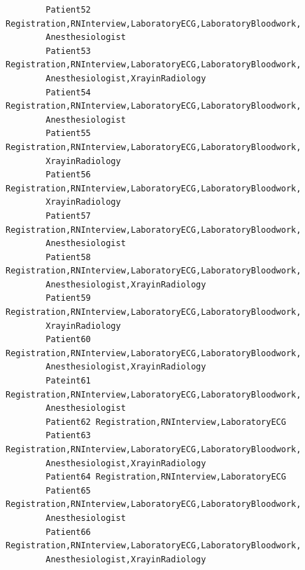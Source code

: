 \documentclass[12pt]{article}
\begin{document}
\begin{verbatim}
		Patient52 Registration,RNInterview,LaboratoryECG,LaboratoryBloodwork,
		Anesthesiologist
		Patient53 Registration,RNInterview,LaboratoryECG,LaboratoryBloodwork,
		Anesthesiologist,XrayinRadiology
		Patient54 Registration,RNInterview,LaboratoryECG,LaboratoryBloodwork,
		Anesthesiologist
		Patient55 Registration,RNInterview,LaboratoryECG,LaboratoryBloodwork,
		XrayinRadiology
		Patient56 Registration,RNInterview,LaboratoryECG,LaboratoryBloodwork,
		XrayinRadiology
		Patient57 Registration,RNInterview,LaboratoryECG,LaboratoryBloodwork,
		Anesthesiologist
		Patient58 Registration,RNInterview,LaboratoryECG,LaboratoryBloodwork,
		Anesthesiologist,XrayinRadiology
		Patient59 Registration,RNInterview,LaboratoryECG,LaboratoryBloodwork,
		XrayinRadiology
		Patient60 Registration,RNInterview,LaboratoryECG,LaboratoryBloodwork,
		Anesthesiologist,XrayinRadiology
		Pateint61 Registration,RNInterview,LaboratoryECG,LaboratoryBloodwork,
		Anesthesiologist
		Patient62 Registration,RNInterview,LaboratoryECG
		Patient63 Registration,RNInterview,LaboratoryECG,LaboratoryBloodwork,
		Anesthesiologist,XrayinRadiology
		Patient64 Registration,RNInterview,LaboratoryECG
		Patient65 Registration,RNInterview,LaboratoryECG,LaboratoryBloodwork,
		Anesthesiologist
		Patient66 Registration,RNInterview,LaboratoryECG,LaboratoryBloodwork,
		Anesthesiologist,XrayinRadiology
		\end{verbatim}
		
\end{document}
